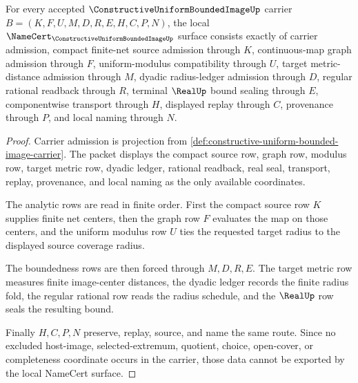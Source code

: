 \begin{theorem}
\label{thm:constructive-uniform-bounded-image-namecert-obligations}
For every accepted $\ConstructiveUniformBoundedImageUp$ carrier $B=(K,F,U,M,D,R,E,H,C,P,N)$, the local $\NameCert_{\ConstructiveUniformBoundedImageUp}$ surface consists exactly of carrier admission, compact finite-net source admission through $K$, continuous-map graph admission through $F$, uniform-modulus compatibility through $U$, target metric-distance admission through $M$, dyadic radius-ledger admission through $D$, regular rational readback through $R$, terminal $\RealUp$ bound sealing through $E$, componentwise transport through $H$, displayed replay through $C$, provenance through $P$, and local naming through $N$.
\end{theorem}
\begin{proof}
Carrier admission is projection from \autoref{def:constructive-uniform-bounded-image-carrier}. The packet displays the compact source row, graph row, modulus row, target metric row, dyadic ledger, rational readback, real seal, transport, replay, provenance, and local naming as the only available coordinates.

The analytic rows are read in finite order. First the compact source row $K$ supplies finite net centers, then the graph row $F$ evaluates the map on those centers, and the uniform modulus row $U$ ties the requested target radius to the displayed source coverage radius.

The boundedness rows are then forced through $M,D,R,E$. The target metric row measures finite image-center distances, the dyadic ledger records the finite radius fold, the regular rational row reads the radius schedule, and the $\RealUp$ row seals the resulting bound.

Finally $H,C,P,N$ preserve, replay, source, and name the same route. Since no excluded host-image, selected-extremum, quotient, choice, open-cover, or completeness coordinate occurs in the carrier, those data cannot be exported by the local NameCert surface.
\end{proof}

